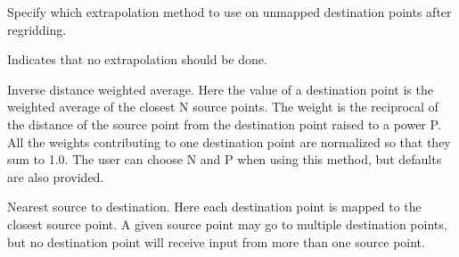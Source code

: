 \documentclass[letterpaper,10pt,english]{sphinxmanual}
\begin{document}
\begin{fulllineitems}
\label{\detokenize{ExtrapMethod:ESMF.api.constants.ExtrapMethod}}
Specify which extrapolation method to use on unmapped destination points after 
regridding.

\begin{fulllineitems}
\label{\detokenize{ExtrapMethod:ESMF.api.constants.ExtrapMethod.NONE}}
Indicates that no extrapolation should be done.

\end{fulllineitems}


\begin{fulllineitems}
\label{\detokenize{ExtrapMethod:ESMF.api.constants.ExtrapMethod.NEAREST_STOD}}
Inverse distance weighted average. 
Here the value of a destination point is the weighted average of the 
closest N source points. The weight is the reciprocal of the distance of 
the source point from the destination point raised to a power P. All the
weights contributing to one destination point are normalized so that they 
sum to 1.0. The user can choose N and P when using this method, but 
defaults are also provided.

\end{fulllineitems}


\begin{fulllineitems}
\label{\detokenize{ExtrapMethod:ESMF.api.constants.ExtrapMethod.NEAREST_IDAVG}}
Nearest source to destination. 
Here each destination point is mapped to the closest source point. A given 
source point may go to multiple destination points, but no destination 
point will receive input from more than one source point.


\end{fulllineitems}
\end{fulllineitems}
\end{document}
